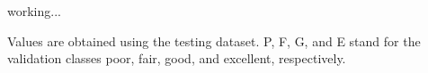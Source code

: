 working...

Values are obtained using the testing dataset. P, F, G, and E stand for the validation classes poor, fair, good, and excellent, respectively.




